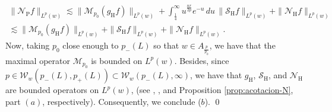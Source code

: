 \documentclass[11pt, a4paper,leqno]{amsart}
\theoremstyle{plain}
\theoremstyle{definition}
\theoremstyle{remark}
\numberwithin{equation}{section}
\def \Scal{ \mathcal{S} }
\def \hh{ \mathrm{H} }
\def \pp{ \mathrm{P} }
\def \Ncal { \mathcal{N} }
\begin{document}
\begin{multline*}
\|\Ncal_{\pp}f\|_{L^p(w)}\lesssim \|\mathcal{M}_{p_0}(g_{\hh}f)\|_{L^p(w)}+\int_{\frac{1}{4}}^{\infty}u^{\frac{nr}{2p}}e^{-u}\,du\, \|\Scal_{\hh}f\|_{L^p(w)}+\|\Ncal_{\hh}f\|_{L^p(w)}
\\
\lesssim 
\|\mathcal{M}_{p_0}(g_{\hh}f)\|_{L^p(w)}+ \|\Scal_{\hh}f\|_{L^p(w)}+\|\Ncal_{\hh}f\|_{L^p(w)}.
\end{multline*}
Now, taking $p_0$ close enough to $p_-(L)$ so that $w\in A_{\frac{p}{p_0}}$,  we have that the maximal operator $\mathcal{M}_{p_0}$ is bounded on $L^p(w)$. Besides, since $p\in \mathcal{W}_w(p_-(L),p_+(L))\subset \mathcal{W}_w(p_-(L),\infty)$, we have that $g_{\hh}$, $\mathcal{S}_{\hh}$, and $\mathcal{N}_{\hh}$ are bounded operators on $L^p(w)$,  (see \cite[Theorem 7.6, $(a)$]{AuscherMartell:III}, \cite[Theorem 1.12, $(a)$]{MartellPrisuelos}, and Proposition \ref{prop:acotacion-N}, part $(a)$, respectively). Consequently,
we conclude ($b$). \qed



\bigskip
\end{document}
